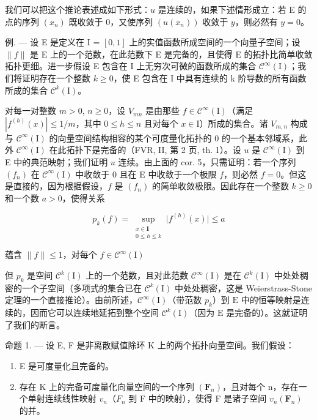 我们可以把这个推论表述成如下形式：\(u\) 是连续的，如果下述情形成立：若 E 的点的序列 \((x_{n})\) 既收敛于 0，又使序列 \((u(x_{n}))\) 收敛于 \(y\)，则必然有 \(y = 0\)。

例. --- 设 E 是定义在 I = \([0, 1]\) 上的实值函数所成空间的一个向量子空间；设 \(\|f\|\) 是 E 上的一个范数，在此范数下 E 是完备的，且使得 E 的拓扑比简单收敛拓扑更细。进一步假设 E 包含在 I 上无穷次可微的函数所成的集合 \(\mathcal{C}^{\infty}(\mathrm{I})\)；我们将证明存在一个整数 \(k \geqslant 0\)，使 E 包含在 I 中具有连续的 k 阶导数的所有函数所成的集合 \(\mathcal{C}^{k}(\mathrm{I})\)。

对每一对整数 \(m > 0\), \(n \geqslant 0\)，设 \(V_{mn}\) 是由那些 \(f \in \mathcal{C}^{\infty}(\mathrm{I})\)（满足 \(|f^{(h)}(x)| \leqslant 1 / m\)，其中 \(0 \leqslant h \leqslant n\) 且对每个 \(x \in \mathrm{I}\)）所成的集合。诸 \(V_{m,n}\) 构成与 \(\mathcal{C}^{\infty}(\mathrm{I})\) 的向量空间结构相容的某个可度量化拓扑的 0 的一个基本邻域系，此外 \(\mathcal{C}^{\infty}(\mathrm{I})\) 在此拓扑下是完备的（FVR, II, 第 2 页, th. 1）。设 \(u\) 是 \(\mathcal{C}^{\infty}(\mathrm{I})\) 到 E 中的典范映射；我们证明 \(u\) 连续。由上面的 cor. 5，只需证明：若一个序列 \((f_n)\) 在 \(\mathcal{C}^{\infty}(\mathrm{I})\) 中收敛于 0 且在 E 中收敛于一个极限 \(f\)，则必然 \(f = 0\)。但这是直接的，因为根据假设，\(f\) 是 \((f_n)\) 的简单收敛极限。因此存在一个整数 \(k \geqslant 0\) 和一个数 \(a > 0\)，使得关系

\[
p_{k}(f) = \sup_{\substack{x\in \mathbf{I}\\ 0\leqslant h\leqslant k}}\big|f^{(h)}(x)\big|\leqslant a
\]

蕴含 \(\| f\| \leqslant 1\)，对每个 \(f\in \mathcal{C}^{\infty}(\mathrm{I})\)

但 \(p_k\) 是空间 \(\mathcal{C}^k(\mathrm{I})\) 上的一个范数，且对此范数 \(\mathcal{C}^\infty(\mathrm{I})\) 是在 \(\mathcal{C}^k(\mathrm{I})\) 中处处稠密的一个子空间（多项式的集合已在 \(\mathcal{C}^k(\mathrm{I})\) 中处处稠密，这是 Weierstrass-Stone 定理的一个直接推论）。由前所述，\(\mathcal{C}^\infty(\mathrm{I})\)（带范数 \(p_k\)）到 \(\mathrm{E}\) 中的恒等映射是连续的，因而它可以连续地延拓到整个空间 \(\mathcal{C}^k(\mathrm{I})\)（因为 \(\mathrm{E}\) 是完备的）。这就证明了我们的断言。

命题 1. --- 设 E, F 是非离散赋值除环 K 上的两个拓扑向量空间。我们假设：

\begin{enumerate}
\def\labelenumi{\arabic{enumi})}
\item
  E 是可度量化且完备的。
\item
  存在 K 上的完备可度量化向量空间的一个序列 \((\mathbf{F}_{n})\)，且对每个 n，存在一个单射连续线性映射 \(v_{n}\)（\(F_{n}\) 到 F 中的映射），使得 F 是诸子空间 \(v_{n}(\mathbf{F}_{n})\) 的并。
\end{enumerate}

